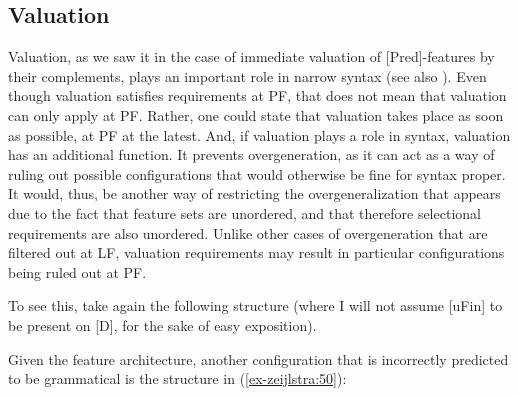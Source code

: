 \documentclass[output=paper
,modfonts
,nonflat]{langsci/langscibook}
\begin{document}
\subsection{Valuation} \label{sec-zeijlstra:4.3}
Valuation, as we saw it in the case of immediate valuation of [Pred]-features by their complements, plays an important role in narrow syntax (see also \citealt{Bjorkman_ZeijlstraTA}). Even though valuation satisfies requirements at PF, that does not mean that valuation can only apply at PF. Rather, one could state that valuation takes place as soon as possible, at PF at the latest. And, if valuation plays a role in syntax, valuation has an additional function. It prevents overgeneration, as it can act as a way of ruling out possible configurations that would otherwise be fine for syntax proper. It would, thus, be another way of restricting the overgeneralization that appears due to the fact that feature sets are unordered, and that therefore selectional requirements are also unordered. Unlike other cases of overgeneration that are filtered out at LF, valuation requirements may result in particular configurations being ruled out at PF.

To see this, take again the following structure (where I will not assume [uFin] to be present on [D], for the sake of easy exposition).

\begin{figure}[!h]
	\begin{exe}
	\end{exe}\vspace{-0.7cm}
\end{figure}
\noindent Given the feature architecture, another configuration that is incorrectly predicted to be grammatical is the structure in (\ref{ex-zeijlstra:50}):
\end{document}
